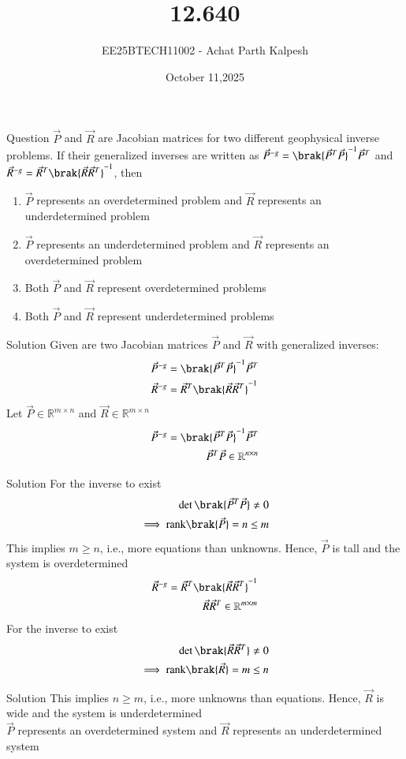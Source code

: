 \documentclass{beamer}
\title %
{12.640}
\date{October 11,2025}
\author %
{EE25BTECH11002 - Achat Parth Kalpesh}
\begin{document}
\frame{\titlepage}

\begin{frame}{Question}
$\vec{P}$ and $\vec{R}$ are Jacobian matrices for two different geophysical inverse problems. If their generalized inverses are written as $\vec{P}^{-g} = \brak{\vec{P}^T \vec{P}}^{-1} \vec{P}^T$ and $\vec{R}^{-g} = \vec{R}^T\brak{\vec{R} \vec{R}^T}^{-1}$, then
\begin{enumerate}
    \item $\vec{P}$ represents an overdetermined problem and $\vec{R}$ represents an underdetermined problem
    \item $\vec{P}$ represents an underdetermined problem and $\vec{R}$ represents an overdetermined problem
    \item Both $\vec{P}$ and $\vec{R}$ represent overdetermined problems
    \item Both $\vec{P}$ and $\vec{R}$ represent underdetermined problems
\end{enumerate}
\end{frame}

\begin{frame}{Solution}
Given are two Jacobian matrices $\vec{P}$ and $\vec{R}$ with generalized inverses:
\begin{align}
    \vec{P}^{-g} &= \brak{\vec{P}^T \vec{P}}^{-1} \vec{P}^T \\
    \vec{R}^{-g} &= \vec{R}^T \brak{\vec{R} \vec{R}^T}^{-1}
\end{align}
Let $\vec{P} \in \mathbb{R}^{m \times n}$ and $\vec{R} \in \mathbb{R}^{m \times n}$
\begin{align}
    \vec{P}^{-g} = \brak{\vec{P}^T \vec{P}}^{-1} \vec{P}^T\\
    \vec{P}^T \vec{P} \in \mathbb{R}^{n \times n}
\end{align}
\end{frame}



\begin{frame}{Solution}
For the inverse to exist
\begin{align}
   \det\brak{\vec{P}^T \vec{P}} \neq 0 \\
   \implies \text{rank}\brak{\vec{P}} = n \leq m
\end{align}
This implies $m \geq n$, i.e., more equations than unknowns. Hence, $\vec{P}$ is tall and the system is overdetermined
\begin{align}
    \vec{R}^{-g} = \vec{R}^T \brak{\vec{R} \vec{R}^T}^{-1}\\
    \vec{R} \vec{R}^T \in \mathbb{R}^{m \times m}
\end{align}
For the inverse to exist
\begin{align}
    \det\brak{\vec{R} \vec{R}^T} \neq 0 \\
    \implies \text{rank}\brak{\vec{R}} = m \leq n
\end{align}
\end{frame}

\begin{frame}{Solution}
This implies $n \geq m$, i.e., more unknowns than equations. Hence, $\vec{R}$ is wide and the system is underdetermined\\
$\vec{P}$ represents an overdetermined system and $\vec{R}$ represents an underdetermined system
\end{frame}
\end{document}
